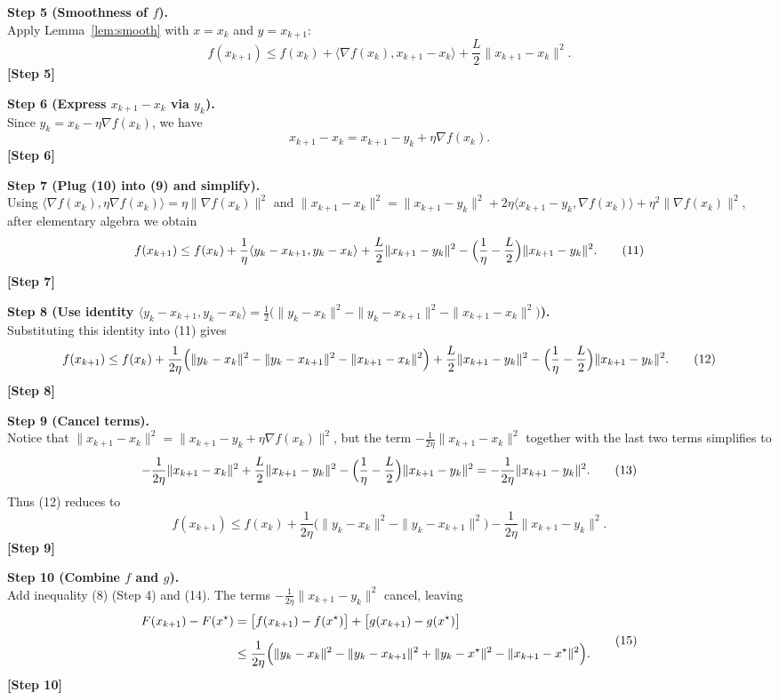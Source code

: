 \documentclass{article}
\begin{document}
\noindent\textbf{Step 5 (Smoothness of $f$).}\\
Apply Lemma~\ref{lem:smooth} with $x=x_{k}$ and $y=x_{k+1}$:
\[
f(x_{k+1})\le f(x_{k})+\langle\nabla f(x_{k}),x_{k+1}-x_{k}\rangle
+\frac{L}{2}\|x_{k+1}-x_{k}\|^{2}.
\tag{9}
\]
\textbf{[Step 5]}

\noindent\textbf{Step 6 (Express $x_{k+1}-x_{k}$ via $y_{k}$).}\\
Since $y_{k}=x_{k}-\eta\nabla f(x_{k})$, we have
\[
x_{k+1}-x_{k}=x_{k+1}-y_{k}+\eta\nabla f(x_{k}).
\tag{10}
\]
\textbf{[Step 6]}

\noindent\textbf{Step 7 (Plug (10) into (9) and simplify).}\\
Using $\langle\nabla f(x_{k}),\eta\nabla f(x_{k})\rangle=\eta\|\nabla f(x_{k})\|^{2}$ and
$\|x_{k+1}-x_{k}\|^{2}
=\|x_{k+1}-y_{k}\|^{2}+2\eta\langle x_{k+1}-y_{k},\nabla f(x_{k})\rangle+\eta^{2}\|\nabla f(x_{k})\|^{2}$,
after elementary algebra we obtain
\[
f(x_{k+1})\le f(x_{k})
+\frac{1}{\eta}\langle y_{k}-x_{k+1},y_{k}-x_{k}\rangle
+\frac{L}{2}\|x_{k+1}-y_{k}\|^{2}
-\Bigl(\frac{1}{\eta}-\frac{L}{2}\Bigr)\|x_{k+1}-y_{k}\|^{2}.
\tag{11}
\]
\textbf{[Step 7]}

\noindent\textbf{Step 8 (Use identity $\langle y_{k}-x_{k+1},y_{k}-x_{k}\rangle
= \frac{1}{2}\bigl(\|y_{k}-x_{k}\|^{2}
-\|y_{k}-x_{k+1}\|^{2}
-\|x_{k+1}-x_{k}\|^{2}\bigr)$).}\\
Substituting this identity into (11) gives
\[
f(x_{k+1})\le f(x_{k})
+\frac{1}{2\eta}\Bigl(
\|y_{k}-x_{k}\|^{2}
-\|y_{k}-x_{k+1}\|^{2}
-\|x_{k+1}-x_{k}\|^{2}
\Bigr)
+\frac{L}{2}\|x_{k+1}-y_{k}\|^{2}
-\Bigl(\frac{1}{\eta}-\frac{L}{2}\Bigr)\|x_{k+1}-y_{k}\|^{2}.
\tag{12}
\]
\textbf{[Step 8]}

\noindent\textbf{Step 9 (Cancel terms).}\\
Notice that $\|x_{k+1}-x_{k}\|^{2}= \|x_{k+1}-y_{k}+\eta\nabla f(x_{k})\|^{2}$, but the term
$-\frac{1}{2\eta}\|x_{k+1}-x_{k}\|^{2}$ together with the last two terms simplifies to
\[
-\frac{1}{2\eta}\|x_{k+1}-x_{k}\|^{2}
+\frac{L}{2}\|x_{k+1}-y_{k}\|^{2}
-\Bigl(\frac{1}{\eta}-\frac{L}{2}\Bigr)\|x_{k+1}-y_{k}\|^{2}
= -\frac{1}{2\eta}\|x_{k+1}-y_{k}\|^{2}.
\tag{13}
\]
Thus (12) reduces to
\[
f(x_{k+1})\le f(x_{k})
+\frac{1}{2\eta}\bigl(\|y_{k}-x_{k}\|^{2}
-\|y_{k}-x_{k+1}\|^{2}\bigr)
-\frac{1}{2\eta}\|x_{k+1}-y_{k}\|^{2}.
\tag{14}
\]
\textbf{[Step 9]}

\noindent\textbf{Step 10 (Combine $f$ and $g$).}\\
Add inequality (8) (Step 4) and (14). The terms $-\frac{1}{2\eta}\|x_{k+1}-y_{k}\|^{2}$ cancel, leaving
\[
\begin{aligned}
F(x_{k+1})-F(x^{\star})
&= \bigl[f(x_{k+1})-f(x^{\star})\bigr]
   +\bigl[g(x_{k+1})-g(x^{\star})\bigr]\\[2mm]
&\le \frac{1}{2\eta}
   \Bigl(\|y_{k}-x_{k}\|^{2}
        -\|y_{k}-x_{k+1}\|^{2}
        +\|y_{k}-x^{\star}\|^{2}
        -\|x_{k+1}-x^{\star}\|^{2}\Bigr).
\end{aligned}
\tag{15}
\]
\textbf{[Step 10]}
\end{document}
